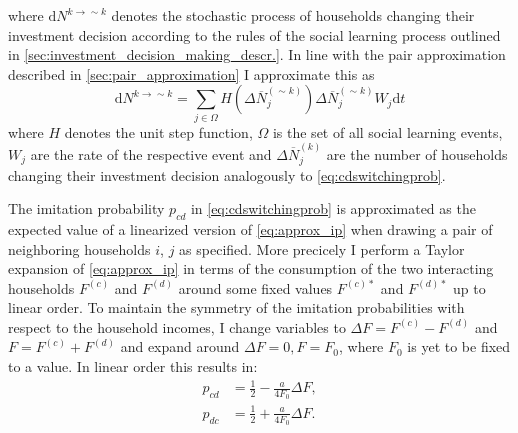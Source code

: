 where $\mathrm{ d} N^{k \rightarrow \sim k}$ denotes the stochastic process of households changing their investment decision according to the rules of the social learning process outlined in \cref{sec:investment_decision_making_descr.}. In line with the pair approximation described in \cref{sec:pair_approximation} I approximate this as
\begin{equation}
    \mathrm{ d} N^{k \rightarrow \sim k} = \sum_{j \in \Omega} H\left(\Delta \overbar{N}_j^{(\sim k)}\right) \Delta \overbar{N}_j^{(\sim k)}W_j \mathrm{ d}t
\end{equation}
where $H$ denotes the unit step function, $\Omega$ is the set of all social learning events, $W_j$ are the rate of the respective event and $\Delta \overbar{N}_j^{(k)}$ are the number of households changing their investment decision analogously to \cref{eq:cdswitchingprob}. 

The imitation probability $p_{cd}$ in \cref{eq:cdswitchingprob} is approximated as the expected value of a linearized version of \cref{eq:approx_ip} when drawing a pair of neighboring households $i$, $j$ as specified. More precicely I perform a Taylor expansion of \cref{eq:approx_ip} in terms of the consumption of the two interacting households $F^{(c)}$ and $F^{(d)}$ around some fixed values $F^{(c)*}$ and $F^{(d)*}$ up to linear order. To maintain the symmetry of the imitation probabilities with respect to the household incomes, I change variables to $\Delta F = F^{(c)} - F^{(d)}$ and $F = F^{(c)} + F^{(d)}$ and expand around $\Delta F = 0, F = F_0$, where $F_0$ is yet to be fixed to a value. In linear order this results in:
\begin{align}
	p_{cd} &= \frac{1}{2} - \frac{a}{4 F_0} \Delta F, \label{eq:approx_p_cd}\\
	p_{dc} &= \frac{1}{2} + \frac{a}{4 F_0} \Delta F. \label{eq:approx_p_dc}
\end{align}

